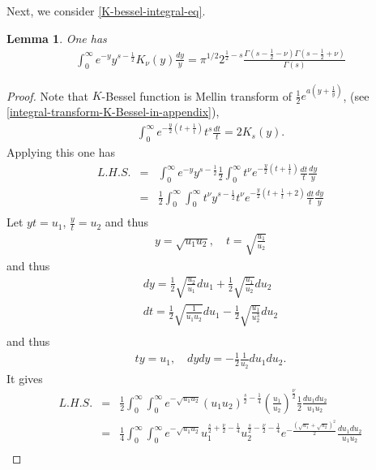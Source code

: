 \documentclass[11pt,reqno]{amsart}
\newcommand{\bna}{\begin{eqnarray*}}
\newcommand{\ena}{\end{eqnarray*}}
\newtheorem{lemma}{Lemma}[section]
\theoremstyle{definition}
\begin{document}
Next, we consider \eqref{K-bessel-integral-eq}.
\begin{lemma}\label{lemma-K-bessel-eq}
One has
\bna
\int_0^\infty  e^{-y}y^{s-\frac{1}{2}}K_{\nu}(y)\frac{dy}{y}
=\pi^{1/2}2^{\frac{1}{2}-s}\frac{\Gamma(s-\frac{1}{2}-\nu)\Gamma(s-\frac{1}{2}+\nu)}{\Gamma(s)}
\ena

\end{lemma}
\begin{proof}
Note that $K$-Bessel function is Mellin transform of $\frac{1}{2}e^{a(y+\frac{1}{y})}$, (see \eqref{integral-transform-K-Bessel-in-appendix}),
\bna
\int_0^\infty e^{-\frac{y}{2}(t+\frac{1}{t})}t^s\frac{dt}{t}=2 K_s(y).
\ena
Applying this one has
\bna
L.H.S.&=&\int_0^\infty e^{-y}y^{s-\frac{1}{2}}
\frac{1}{2}\int_0^\infty t^\nu e^{-\frac{y}{2}(t+\frac{1}{t})}\frac{dt}{t}
\frac{dy}{y}\\
&=&\frac{1}{2}\int_0^\infty \int_0^\infty  t^{\nu}y^{s-\frac{1}{2}}
 t^\nu e^{-\frac{y}{2}(t+\frac{1}{t}+2)}\frac{dt}{t}
\frac{dy}{y}\\
\ena
Let $yt=u_1$, $\frac{y}{t}=u_2$ and thus
\bna
y=\sqrt{u_1u_2},\quad t=\sqrt{\frac{u_1}{u_2}}
\ena
and thus
\bna
dy=\frac{1}{2}\sqrt{\frac{u_2}{u_1}}du_1+\frac{1}{2}\sqrt{\frac{u_1}{u_2}}du_2\\
dt=\frac{1}{2}\sqrt{\frac{1}{u_1u_2}}du_1-\frac{1}{2}\sqrt{\frac{u_1}{u_2^3}}du_2\\
\ena
and thus
\bna
ty=u_1,\quad dydy=-\frac{1}{2}\frac{1}{u_2}du_1du_2.
\ena
It gives
\bna
L.H.S.&=&\frac{1}{2}\int_0^\infty\int_0^\infty e^{-\sqrt{u_1u_2}} (u_1u_2)^{\frac{s}{2}-\frac{1}{4}}\left(\frac{u_1}{u_2}\right)^{\frac{\nu}{2}}\frac{1}{2}\frac{du_1du_2}{u_1u_2}\\
&=&\frac{1}{4}\int_0^\infty\int_0^\infty e^{-\sqrt{u_1u_2}} u_1^{\frac{s}{2}+\frac{\nu}{2}-\frac{1}{4}}u_2^{\frac{s}{2}-\frac{\nu}{2}-\frac{1}{4}}
e^{-\frac{(\sqrt{u_1}+\sqrt{u_2})^2}{2}}\frac{du_1du_2}{u_1u_2}\\
\ena

\end{proof}
\end{document}
